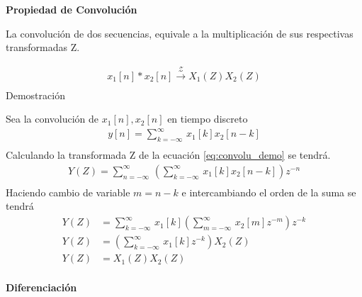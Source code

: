 \documentclass[12pt]{article}
\begin{document}
\textbf{Propiedad de Convolución}
\vspace{5mm}

La convolución de dos secuencias, equivale a la multiplicación de sus respectivas transformadas Z.\par
\begin{equation}
    \begin{split}
        x_{1}[n]*x_{2}[n]\xrightarrow{\mathscr{Z}}X_{1}(Z)X_{2}(Z)\\
    \end{split}
    \label{eq:convolu}
\end{equation}
Demostración

Sea la convolución de $x_{1}[n],x_{2}[n]$ en tiempo discreto
\begin{equation}
    \begin{split}
        y[n]=\displaystyle\sum_{k=-\infty}^{\infty}\,x_{1}[k]x_{2}[n-k]\\
    \end{split}
    \label{eq:convolu_demo}
\end{equation}
Calculando la transformada Z de la ecuación \ref{eq:convolu_demo} se tendrá.
\begin{equation}
    \begin{split}
        Y(Z)=\displaystyle\sum_{n=-\infty}^{\infty}\,(\displaystyle\sum_{k=-\infty}^{\infty}\,x_{1}[k]x_{2}[n-k])z^{-n}\\
    \end{split}
    \label{eq:convolu_demo1}
\end{equation}
Haciendo cambio de variable $m=n-k$ e intercambiando el orden de la suma se tendrá
\begin{equation}
    \begin{split}
        Y(Z)&=\displaystyle\sum_{k=-\infty}^{\infty}\,x_{1}[k](\displaystyle\sum_{m=-\infty}^{\infty}\,x_{2}[m]z^{-m})z^{-k}\\
        Y(Z)&=(\displaystyle\sum_{k=-\infty}^{\infty}\,x_{1}[k]z^{-k})X_{2}(Z)\\
        Y(Z)&=X_{1}(Z)X_{2}(Z)\\
    \end{split}
    \label{eq:convolu_demo2}
\end{equation}

\textbf{Diferenciación}
\vspace{5mm}
\end{document}
